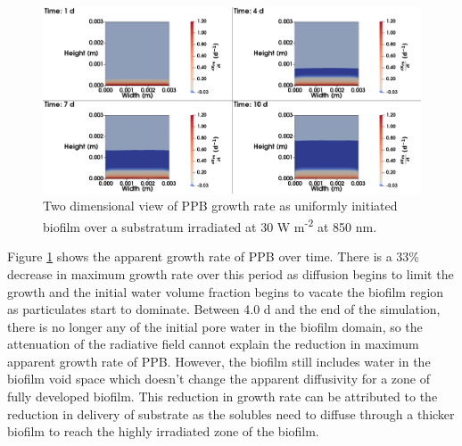 \begin{figure}[H]
    \centering
     \hspace*{-1cm}\includegraphics[width=1.1\textwidth,height=0.4\textheight]{Chap4/methods/data/figures/case1_growth_frac.png}
    \caption{Two dimensional view of PPB growth rate as uniformly initiated biofilm over a substratum irradiated at 30 W m\textsuperscript{-2} at 850 nm.} 
    \label{fig:case1_growth_frac}
\end{figure}

Figure \ref{fig:case1_growth_frac} shows the apparent growth rate of PPB over time. There is a 33\% decrease in maximum growth rate over this period as diffusion begins to limit the growth and the initial water volume fraction begins to vacate the biofilm region as particulates start to dominate. Between 4.0 d and the end of the simulation, there is no longer any of the initial pore water in the biofilm domain, so the attenuation of the radiative field cannot explain the reduction in maximum apparent growth rate of PPB. However, the biofilm still includes water in the biofilm void space which doesn't change the apparent diffusivity for a zone of fully developed biofilm. This reduction in growth rate can be attributed to the reduction in delivery of substrate as the solubles need to diffuse through a thicker biofilm to reach the highly irradiated zone of the biofilm.

